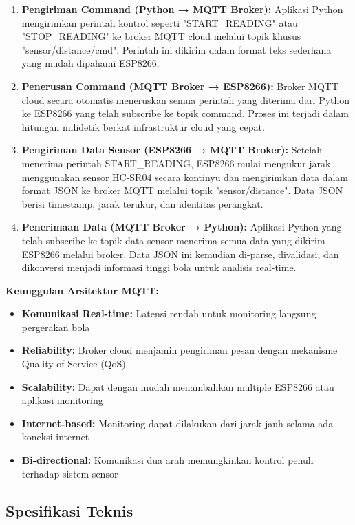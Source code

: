 \documentclass[a4paper,10pt]{article}
\begin{document}
\begin{enumerate}
\item \textbf{Pengiriman Command (Python → MQTT Broker):} Aplikasi Python mengirimkan perintah kontrol seperti "START\_READING" atau "STOP\_READING" ke broker MQTT cloud melalui topik khusus "sensor/distance/cmd". Perintah ini dikirim dalam format teks sederhana yang mudah dipahami ESP8266.

\item \textbf{Penerusan Command (MQTT Broker → ESP8266):} Broker MQTT cloud secara otomatis meneruskan semua perintah yang diterima dari Python ke ESP8266 yang telah subscribe ke topik command. Proses ini terjadi dalam hitungan milidetik berkat infrastruktur cloud yang cepat.

\item \textbf{Pengiriman Data Sensor (ESP8266 → MQTT Broker):} Setelah menerima perintah START\_READING, ESP8266 mulai mengukur jarak menggunakan sensor HC-SR04 secara kontinyu dan mengirimkan data dalam format JSON ke broker MQTT melalui topik "sensor/distance". Data JSON berisi timestamp, jarak terukur, dan identitas perangkat.

\item \textbf{Penerimaan Data (MQTT Broker → Python):} Aplikasi Python yang telah subscribe ke topik data sensor menerima semua data yang dikirim ESP8266 melalui broker. Data JSON ini kemudian di-parse, divalidasi, dan dikonversi menjadi informasi tinggi bola untuk analisis real-time.
\end{enumerate}

\textbf{Keunggulan Arsitektur MQTT:}
\begin{itemize}
\item \textbf{Komunikasi Real-time:} Latensi rendah untuk monitoring langsung pergerakan bola
\item \textbf{Reliability:} Broker cloud menjamin pengiriman pesan dengan mekanisme Quality of Service (QoS)
\item \textbf{Scalability:} Dapat dengan mudah menambahkan multiple ESP8266 atau aplikasi monitoring
\item \textbf{Internet-based:} Monitoring dapat dilakukan dari jarak jauh selama ada koneksi internet
\item \textbf{Bi-directional:} Komunikasi dua arah memungkinkan kontrol penuh terhadap sistem sensor
\end{itemize}

\subsection{Spesifikasi Teknis}
\end{document}
